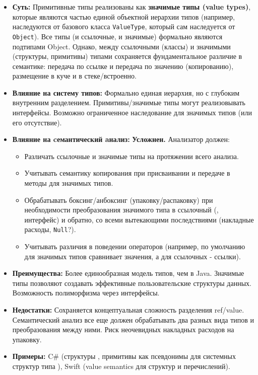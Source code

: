 \begin{itemize}[leftmargin=*, label={--}]
    \item \textbf{Суть:} Примитивные типы реализованы как \textbf{значимые типы (value types)}, которые являются частью единой объектной иерархии типов (например, наследуются от базового класса \texttt{ValueType}, который сам наследуется от \texttt{Object}). Все типы (и ссылочные, и значимые) формально являются подтипами Object. Однако, между ссылочными (классы) и значимыми (структуры, примитивы) типами сохраняется фундаментальное различие в семантике: передача по ссылке и передача по значению (копированию), размещение в куче и в стеке/встроенно.

    \item \textbf{Влияние на систему типов:} Формально единая иерархия, но с глубоким внутренним разделением. Примитивы/значимые типы могут реализовывать интерфейсы. Возможно ограниченное наследование для значимых типов (или его отсутствие).

    \item \textbf{Влияние на cемантический aнализ:}
    \textbf{Усложнен.}
    Анализатор должен:
    \begin{itemize}
        \item Различать ссылочные и значимые типы на протяжении всего анализа.
        \item Учитывать семантику копирования при присваивании и передаче в методы для значимых типов.
        \item Обрабатывать боксинг/анбоксинг (упаковку/распаковку) при необходимости преобразования значимого типа в ссылочный (, интерфейс) и обратно, со всеми вытекающими последствиями (накладные расходы, \texttt{Null}?).
        \item Учитывать различия в поведении операторов (например, \code{==} по умолчанию для значимых типов сравнивает значения, а для ссылочных - ссылки).
    \end{itemize}

    \item \textbf{Преимущества:} Более единообразная модель типов, чем в Java. Значимые типы позволяют создавать эффективные пользовательские структуры данных. Возможность полиморфизма через интерфейсы.

    \item \textbf{Недостатки:} Сохраняется концептуальная сложность разделения ref/value. Семантический анализ все еще должен обрабатывать два разных вида типов и преобразования между ними. Риск неочевидных накладных расходов на упаковку.

    \item \textbf{Примеры:} C\# (структуры , примитивы как псевдонимы для системных структур типа ), Swift (value semantics для структур и перечислений).
\end{itemize}


